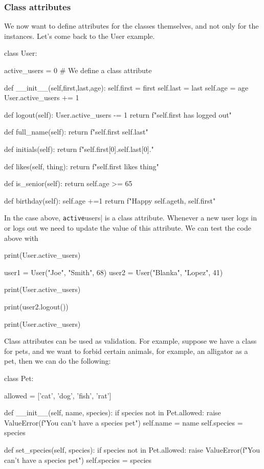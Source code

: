 
\subsubsection{Class attributes}

We now want to define attributes for the classes themselves, and not only for the instances. Let's come back to the User example. 
\begin{listing}{1}
class User:

    active_users = 0 # We define a class attribute

    def __init__(self,first,last,age):
        self.first = first
        self.last = last
        self.age = age
        User.active_users += 1

    def logout(self): 
        User.active_users -= 1 
        return f"{self.first} has logged out"  

    def full_name(self):
        return f"{self.first} {self.last}"

    def initials(self):
        return f"{self.first[0]}.{self.last[0]}."

    def likes(self, thing):
        return f"{self.first} likes {thing}"

    def is_senior(self):
        return self.age >= 65    

    def birthday(self):
        self.age +=1
        return f"Happy {self.age}th, {self.first}"
\end{listing}

In the case above, \verb|active|users| is a class attribute. Whenever a new user logs in or logs out we need to update the value of this attribute. We can test the code above with 

\begin{listingcont}{1}
print(User.active_users)

user1 = User("Joe", "Smith", 68)        
user2 = User("Blanka", "Lopez", 41)

print(User.active_users)

print(user2.logout())

print(User.active_users)
\end{listingcont}

Class attributes can be used as validation. For example, suppose we have a class for pets, and we want to forbid certain animals, for example, an alligator as a pet, then we can do the following:
\begin{listing}{1}
class Pet:

allowed = ['cat', 'dog', 'fish', 'rat']

def __init__(self, name, species):
	if species not in Pet.allowed:
		raise ValueError(f"You can't have a {species} pet")
	self.name = name
	self.species = species

def set_species(self, species):
	if species not in Pet.allowed:
		raise ValueError(f"You can't have a {species} pet")
	self.species = species	
\end{listing}

